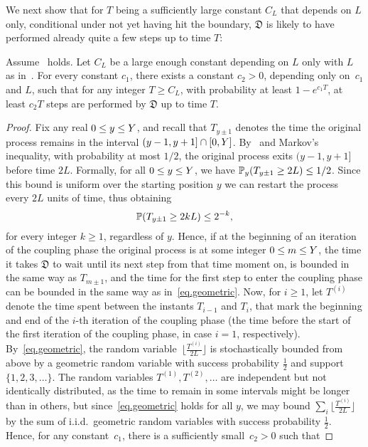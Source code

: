 	We next show that for $T$ being a sufficiently large constant $C_L$ that depends on $L$ only, conditional under not yet having hit the boundary, $\mathfrak{D}$ is likely to have performed already quite a few steps up to time $T$: 
	\begin{lemma}\label{geometricdominationlemma}
Assume~ holds. Let $C_L$ be a large enough constant depending on $L$ only with $L$ as in~. %
For every constant $c_1$, there exists a constant $c_2 > 0$, depending only on~$c_1$ and $L$, such that for any integer $T \ge C_L$, with probability at least $1-e^{c_1 T}$, at least $c_2 T$ steps are performed by $\mathfrak{D}$ up to time $T$.
	\end{lemma}
	\begin{proof} %
	Fix any real $0 \le y \le \auxY$, and recall that  $T_{y\pm 1}$ denotes the time the original process remains in the interval $(y-1,y+1] \cap [0,\auxY]$. By~ and Markov's inequality, with probability at most $1/2$, the original process exits $(y-1,y+1]$ before time $2 L$. Formally, for all $0 \le y \le \auxY$, we have $\PP_{y}(T_{y \pm 1}\ge 2 L) \leq 1/2$. 
Since this bound is uniform over the starting position $y$ we can restart the process every $2 L$ units of time, thus obtaining
\begin{equation}\label{eq.geometric}
    \P(T_{y\pm 1}\geq 2kL)\leq 2^{-k},
\end{equation} for every integer $k\ge 1$, regardless of $y$. Hence, if at the beginning of an iteration of the coupling phase the original process is at some integer $0 \le m \le \auxY$, the time it takes $\mathfrak{D}$ to wait until its next step from that time moment on, is bounded in the same way as $T_{m\pm 1}$, and the time for the first step to enter the coupling phase can be bounded in the same way as in~\eqref{eq.geometric}. Now, for $i\ge 1$, let $T^{(i)}$ denote the time spent between the instants $T_{i-1}$ and $T_i$, that mark the beginning and end of the $i$-th iteration of the coupling phase (the time before the start of the first iteration of the coupling phase, in case $i=1$, respectively). By~\eqref{eq.geometric}, the random variable~$\lfloor\frac{T^{(i)}}{2 L}\rfloor$ is stochastically bounded from above by a geometric random variable with success probability $\frac{1}{2}$ and support $\{1,2,3,\ldots\}$. The random variables $T^{(1)}, T^{(2)}, \ldots$ are independent but not identically distributed, as the time to remain in some intervals might be longer than in others, but since~\eqref{eq.geometric} holds for all $y$, we may bound $\sum_i \lfloor \frac{T^{(i)}}{2L} \rfloor$ by the sum of  i.i.d.\ geometric random variables with success probability $\frac12$. Hence, for any constant~$c_1$, there is a sufficiently small~$c_2>0$ such that

\end{proof}
